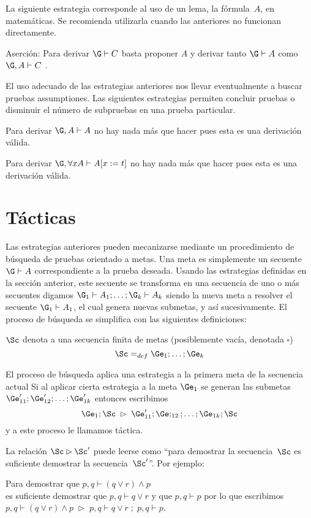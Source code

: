 \documentclass[11pt,letterpaper]{article}
\begin{document}
La siguiente estrategia corresponde al uso de un lema, la fórmula~$A$, en 
matemáticas. Se recomienda utilizarla cuando las anteriores no funcionan 
directamente.
\bi
\item Aserción: Para derivar $\G\vdash C$ basta proponer $A$ y derivar tanto
$\G\vdash A$  como  $\G,A\vdash C$ .
\ei

El uso adecuado de las estrategias anteriores nos llevar eventualmente  a 
buscar pruebas assumptiones. Las siguientes estrategias permiten concluir 
pruebas 
o disminuir el número de subpruebas en una prueba particular.
\bi
\item Para derivar $ \G,A\vdash A $
 no hay nada más que hacer pues esta es una derivación válida.
\item Para derivar $\G,\forall xA\vdash A[x:=t]$ no hay nada más que 
hacer pues esta es una derivación válida.
\ei

\section{Tácticas}
Las estrategias anteriores pueden mecanizarse mediante un procedimiento de 
búsqueda de pruebas orientado a metas. Una meta es simplemente un 
secuente~$\G\vdash A$ correspondiente a la prueba deseada. Usando las 
estrategias definidas en la sección anterior, este secuente se transforma en 
una secuencia de uno o más secuentes digamos 
$\G_1\vdash A_1;\ldots ;\G_k\vdash A_k$ siendo la nueva meta a 
resolver el secuente $\G_1\vdash A_1$, el cual genera nuevas submetas, y así 
sucesivamente. El proceso de búsqueda se simplifica con las siguientes 
definiciones:
\bi
\item $\Sc$ denota a una secuencia finita de metas (posiblemente vacía, 
denotada $\square$) 
$$ \Sc=_{def}\Ge_1;\ldots;\Ge_k $$

\item El proceso de búsqueda aplica una estrategia a la primera meta de la 
secuencia actual Si al aplicar cierta estrategia a la meta $\Ge_1$ se generan 
las submetas 
$\Ge'_{11};\Ge'_{12};\ldots;\Ge'_{1k}$ entonces escribimos
$$ \Ge_1;\Sc\;\rhd\;\Ge'_{11};\Ge;_{12};\ldots;\Ge_{1k};\Sc $$
y a este proceso le llamamos táctica.

\item La relación $\Sc\rhd \Sc'$ puede leerse como \enquote{para demostrar la 
secuencia~$\Sc$ es suficiente demostrar la secuencia~$\Sc'$}. Por ejemplo:
\bi
 \item Para demostrar que $p,q\vdash (q\lor r) \land p$ \\
  es suficiente demostrar que $p,q\vdash q\lor r$  y que $p,q\vdash p$
  por lo que escribimos 
  $p,q\vdash (q\lor r) \land p\;\rhd\;p,q\vdash q\lor r\;; \;p,q\vdash p$.
  
\end{document}
